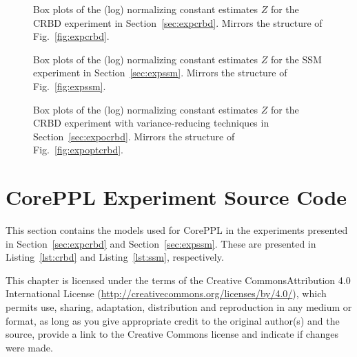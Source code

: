 \documentclass[runningheads]{llncs}
\begin{document}
\begin{figure}
  \resizebox{\textwidth}{!}{}
  \caption{Box plots of the (log) normalizing constant estimates $Z$ for the CRBD experiment in Section~\ref{sec:expcrbd}. Mirrors the structure of Fig.~\ref{fig:expcrbd}.}
  \label{fig:normcrbd}
\end{figure}

\begin{figure}
  \resizebox{\textwidth}{!}{}
  \caption{Box plots of the (log) normalizing constant estimates $Z$ for the SSM experiment in Section~\ref{sec:expssm}. Mirrors the structure of Fig.~\ref{fig:expssm}.}
  \label{fig:normssm}
\end{figure}

\begin{figure}
  \resizebox{\textwidth}{!}{}
  \caption{Box plots of the (log) normalizing constant estimates $Z$ for the CRBD experiment with variance-reducing techniques in Section~\ref{sec:expocrbd}. Mirrors the structure of Fig.~\ref{fig:expoptcrbd}.}
  \label{fig:normoptcrbd}
\end{figure}

\section{CorePPL Experiment Source Code}\label{sec:sourcecode}
This section contains the models used for CorePPL in the experiments presented in Section~\ref{sec:expcrbd} and Section~\ref{sec:expssm}.
These are presented in Listing~\ref{lst:crbd} and Listing~\ref{lst:ssm}, respectively.


\fi

\ifccblock

\vfill

{\small\medskip{} This chapter is licensed under the terms of the Creative Commons\break Attribution 4.0 International License (\url{http://creativecommons.org/licenses/by/4.0/}), which permits use, sharing, adaptation, distribution and reproduction in any medium or format, as long as you give appropriate credit to the original author(s) and the source, provide a link to the Creative Commons license and indicate if changes were made.}
\end{document}

